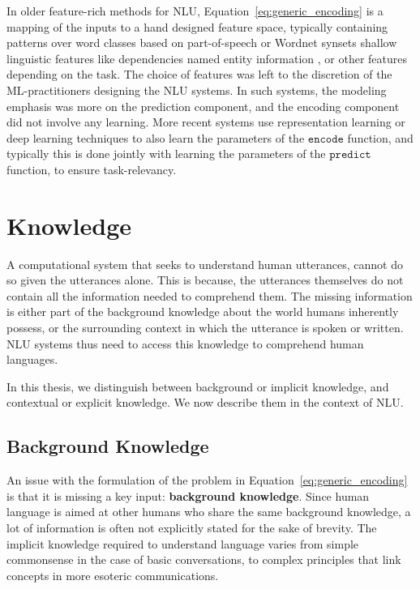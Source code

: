 In older feature-rich methods for NLU, 
Equation~\ref{eq:generic_encoding} is a mapping of the inputs to a hand designed feature space, typically containing patterns over word classes based on
part-of-speech \cite{corley2005measuring} or Wordnet synsets \cite{moldovan2001logic} shallow linguistic features like dependencies \cite{bos2005recognising}
named entity information \cite{tatu2005semantic}, or other features depending on the task. The choice of features was left to the discretion of the ML-practitioners
designing the NLU systems. In such systems, the modeling emphasis was more on the prediction component, and the encoding component did not involve any learning. 
More recent systems \cite[among many others]{bahdanau:14,weston2014memory,hermann2015teaching,Xiong2016DynamicMN,bowman2016fast,yang:16} 
use representation learning or deep learning techniques to also learn the parameters of the
$\mathtt{encode}$ function, and typically this is done jointly with learning the parameters of the $\mathtt{predict}$ function, to ensure task-relevancy.

\section{Knowledge}
\label{sec:intro_external_knowledge}
A computational system that seeks to understand human utterances, cannot do so given the utterances alone. This is because, the utterances themselves
do not contain all the information needed to comprehend them. The missing information is either part of the background knowledge about the world humans
inherently possess, or the surrounding context in which the utterance is spoken or written. NLU systems thus need to access this knowledge to comprehend
human languages.

In this thesis, we distinguish between background or implicit knowledge, and contextual or explicit knowledge. We now describe them in the context of NLU.

\subsection{Background Knowledge}
An issue with the formulation of the problem in Equation~\ref{eq:generic_encoding} is that it is missing a key input: \textbf{background knowledge}. 
Since human language is aimed at other humans who share 
the same background knowledge, a lot of information is often not explicitly stated
for the sake of brevity. The implicit knowledge required to understand language varies 
from simple commonsense in the case of basic conversations, to complex principles that link 
concepts in more esoteric communications.

